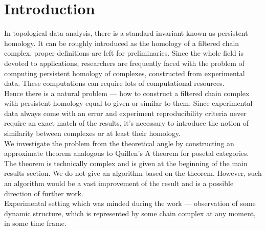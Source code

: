 \documentclass[english,12pt]{article}
\numberwithin{equation}{section}
\theoremstyle{definition}
\theoremstyle{remark}
\begin{document}

\section{Introduction}

In topological data analysis, there is a standard invariant known as persistent homology. It can be roughly introduced as the homology of a filtered chain complex, proper definitions are left for preliminaries. Since the whole field is devoted to applications, researchers are frequently faced with the problem of computing persistent homology of complexes, constructed from experimental data. These computations can require lots of computational resources.\\

Hence there is a natural problem --- how to construct a filtered chain complex with persistent homology equal to given or similar to them. Since experimental data always come with an error and experiment reproducibility criteria never require an exact match of the results, it's necessary to introduce the notion of similarity between complexes or at least their homology.\\

We investigate the problem from the theoretical angle by constructing an approximate theorem analogous to Quillen's A theorem for posetal categories. The theorem is technically complex and is given at the beginning of the main results section. We do not give an algorithm based on the theorem. However, such an algorithm would be a vast improvement of the result and is a possible direction of further work.\\

Experimental setting which was minded during the work --- observation of some dynamic structure, which is represented by some chain complex at any moment, in some time frame.\\
\end{document}
